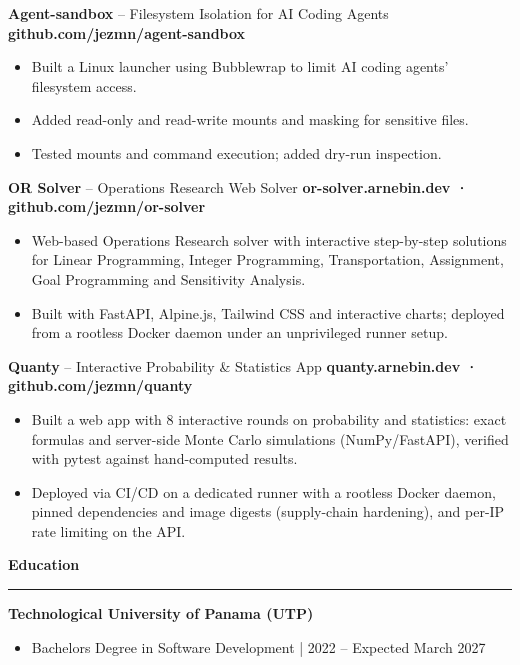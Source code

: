 \documentclass[
]{article}
\newcommand{\sect}[1]{\vspace{4pt}\noindent\textbf{#1}\par\vspace{-2pt}\noindent\rule{\linewidth}{0.4pt}\par\vspace{2pt}}
\begin{document}
\textbf{Agent-sandbox} -- Filesystem Isolation for AI Coding Agents \hfill \textbf{github.com/jezmn/agent-sandbox}

\begin{itemize}
\item
  Built a Linux launcher using Bubblewrap to limit AI coding agents'
  filesystem access.
\item
  Added read-only and read-write mounts and masking for sensitive files.
\item
  Tested mounts and command execution; added dry-run inspection.
\end{itemize}
\vspace*{10pt}

\textbf{OR Solver} -- Operations Research Web Solver \hfill \textbf{or-solver.arnebin.dev · github.com/jezmn/or-solver}

\begin{itemize}
\item
  Web-based Operations Research solver with interactive step-by-step solutions
  for Linear Programming, Integer Programming, Transportation, Assignment,
  Goal Programming and Sensitivity Analysis.
\item
  Built with FastAPI, Alpine.js, Tailwind CSS and interactive charts; deployed
  from a rootless Docker daemon under an unprivileged runner setup.
\end{itemize}
\vspace*{10pt}


\textbf{Quanty} -- Interactive Probability \& Statistics App \hfill \textbf{quanty.arnebin.dev · github.com/jezmn/quanty}

\begin{itemize}
\item
  Built a web app with 8 interactive rounds on probability and statistics:
  exact formulas and server-side Monte Carlo simulations (NumPy/FastAPI),
  verified with pytest against hand-computed results.
\item
  Deployed via CI/CD on a dedicated runner with a rootless Docker daemon,
  pinned dependencies and image digests (supply-chain hardening), and per-IP
  rate limiting on the API.
\end{itemize}
\vspace*{15pt}

\sect{Education}
\vspace*{10pt}

\textbf{Technological University of Panama (UTP)}

\begin{itemize}
\item
  Bachelor\textquotesingle s Degree in Software Development | 2022 -- Expected March 2027
\end{itemize}
\vspace*{15pt}
\end{document}
